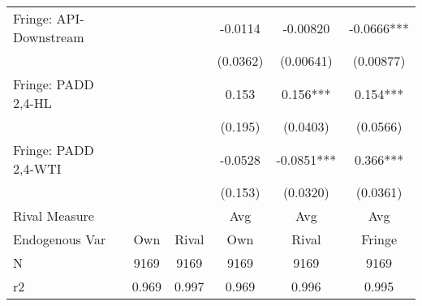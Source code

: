 {\begin{tabular}{l*{5}{c}}
\addlinespace
Fringe: API-Downstream&            &            &  -0.0114   & -0.00820   &  -0.0666***\\
                &            &            & (0.0362)   &(0.00641)   &(0.00877)   \\
\addlinespace
Fringe: PADD 2,4-HL&            &            &    0.153   &    0.156***&    0.154***\\
                &            &            &  (0.195)   & (0.0403)   & (0.0566)   \\
\addlinespace
Fringe: PADD 2,4-WTI&            &            &  -0.0528   &  -0.0851***&    0.366***\\
                &            &            &  (0.153)   & (0.0320)   & (0.0361)   \\
\midrule
Rival Measure   &            &            &      Avg   &      Avg   &      Avg   \\
Endogenous Var  &      Own   &    Rival   &      Own   &    Rival   &   Fringe   \\
N               &     9169   &     9169   &     9169   &     9169   &     9169   \\
r2              &    0.969   &    0.997   &    0.969   &    0.996   &    0.995   \\
\bottomrule
\end{tabular}
}
